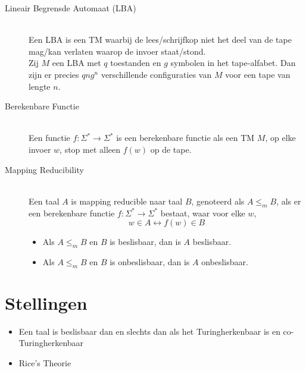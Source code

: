 \documentclass[]{article}
\begin{document}
\begin{itemize}
\begin{description}
	\item[Lineair Begrensde Automaat (LBA)] \hfill \\
	Een LBA is een TM waarbij de lees/schrijfkop niet het deel van de tape mag/kan verlaten waarop de invoer staat/stond.\\
	Zij $M$ een LBA met $q$ toestanden en $g$ symbolen in het tape-alfabet. Dan zijn er precies $qng^n$ verschillende configuraties van $M$ voor een tape van lengte $n$.
	
	\item[Berekenbare Functie] \hfill \\
	Een functie $f: \Sigma^* \rightarrow \Sigma^*$ is een berekenbare functie als een TM $M$, op elke invoer $w$, stop met alleen $f(w)$ op de tape.
	
	\item[Mapping Reducibility] \hfill \\
	Een taal $A$ is mapping reducible naar taal $B$, genoteerd als $A \leq_m B$, als er een berekenbare functie $f: \Sigma^* \rightarrow \Sigma^*$ bestaat, waar voor elke $w$,
	$$w \in A \longleftrightarrow f(w) \in B$$
	\begin{itemize}
		\item Als $A \leq_m B$ en $B$ is beslisbaar, dan is $A$ beslisbaar.
		\item Als $A \leq_m B$ en $B$ is onbeslisbaar, dan is $A$ onbeslisbaar.
	\end{itemize}
\end{description}
\end{itemize}

\section*{Stellingen}
\begin{itemize}
	\item Een taal is beslisbaar dan en slechts dan als het Turingherkenbaar is en co-Turingherkenbaar
	

	\item Rice's Theorie
	
\end{itemize}
\end{document}
